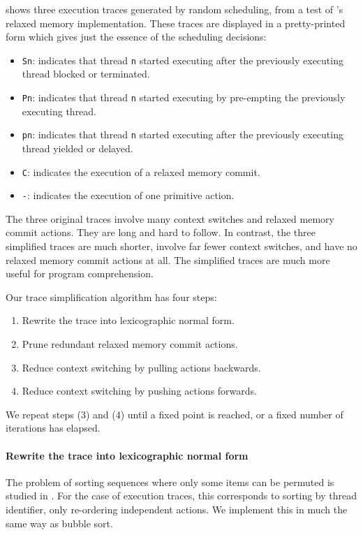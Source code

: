  shows three execution traces generated
by random scheduling, from a test of \dejafu{}'s relaxed memory
implementation.  These traces are displayed in a pretty-printed form
which gives just the essence of the scheduling decisions:

\begin{itemize}
\item \verb|Sn|: indicates that thread \verb|n| started executing
  after the previously executing thread blocked or terminated.
\item \verb|Pn|: indicates that thread \verb|n| started executing by
  pre-empting the previously executing thread.
\item \verb|pn|: indicates that thread \verb|n| started executing
  after the previously executing thread yielded or delayed.
\item \verb|C|: indicates the execution of a relaxed memory commit.
\item \verb|-|: indicates the execution of one primitive action.
\end{itemize}

The three original traces involve many context
switches and relaxed memory commit actions.  They are long and hard to
follow.  In contrast, the three simplified traces are much shorter,
involve far fewer context switches, and have no relaxed memory commit
actions at all.  The simplified traces are much more useful for
program comprehension.

Our trace simplification algorithm has four steps:

\begin{enumerate}
\item Rewrite the trace into lexicographic normal form.
\item Prune redundant relaxed memory commit actions.
\item Reduce context switching by pulling actions backwards.
\item Reduce context switching by pushing actions forwards.
\end{enumerate}

We repeat steps (3) and (4) until a fixed point is reached, or a fixed
number of iterations has elapsed.

\paragraph{Rewrite the trace into lexicographic normal form}
The problem of sorting sequences where only some items can be permuted
is studied in \cite{anisimov1979}.  For the case of execution traces,
this corresponds to sorting by thread identifier, only re-ordering
independent actions.  We implement this in much the same way as bubble
sort.

